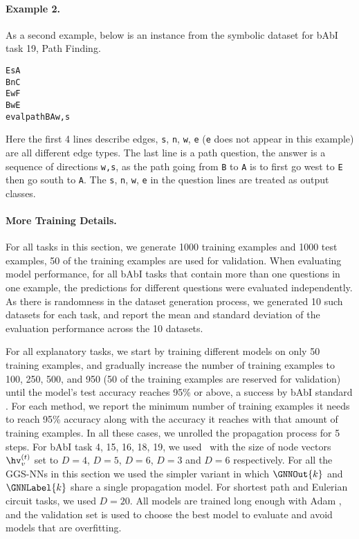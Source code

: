 \paragraph{Example 2. }
As a second example, below is an instance from the symbolic dataset for bAbI task 19, Path Finding.
\begin{framed}
\begin{alltt}
E s A
B n C
E w F
B w E
eval path B A w,s
\end{alltt}
\end{framed}
Here the first 4 lines describe edges, \texttt{s}, \texttt{n}, \texttt{w},
\texttt{e} (\texttt{e} does not appear in this example) are all different edge types. The last line
is a path question, the answer is a sequence of directions \texttt{w,s}, as
the path going from \texttt{B} to \texttt{A} is to first go west to \texttt{E}
then go south to \texttt{A}. The \texttt{s}, \texttt{n}, \texttt{w},
\texttt{e} in the question lines are treated as output classes.

\paragraph{More Training Details. }
For all tasks in this section, we generate 1000 training examples and 1000 test examples,
50 of the training examples are used for validation.
When evaluating model performance, for all bAbI tasks that contain more than
one questions in one example, the predictions for different questions were
evaluated independently.  As there is randomness
in the dataset generation process, we generated 10 such datasets for each
task, and report the mean and standard deviation of the evaluation
performance across the 10 datasets.

For all explanatory tasks, we start by training different models on only 50
training examples, and gradually increase the number of training examples to
100, 250, 500, and 950 (50 of the training examples are reserved for
validation) until the model's test accuracy reaches 95\% or above, a success by
bAbI standard \cite{weston2015towards}. For each method, we report the minimum number of
training examples it needs to reach 95\% accuracy along with the accuracy it
reaches with that amount of training examples.
In all these cases, we unrolled the propagation process for 5 steps.
For bAbI task 4, 15, 16, 18, 19, we used \OurMethodMinorShort~with the size of node
vectors $\hv^{(t)}_v$ set to $D=4$, $D=5$, $D=6$, $D=3$ and $D=6$ respectively.
For all the GGS-NNs in this section we used the simpler variant in which
$\GNNOut{k}$ and $\GNNLabel{k}$ share a single propagation model. For shortest path and Eulerian circuit tasks, we used $D=20$.
All models are trained long enough with Adam \citep{kingma2014adam}, and the validation set is used to choose
the best model to evaluate and avoid models that are overfitting.




